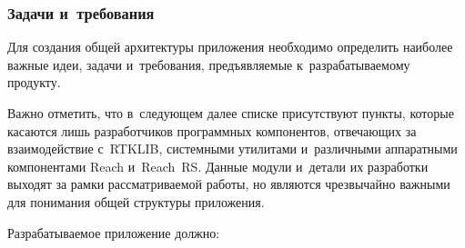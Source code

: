 \subsubsection{Задачи и~требования}
\label{subsec:app-requirements}

Для создания общей архитектуры приложения необходимо определить наиболее важные идеи, задачи и~требования, предъявляемые к~разрабатываемому продукту. \par

Важно отметить, что в~следующем далее списке присутствуют пункты, которые касаются лишь разработчиков программных компонентов, отвечающих за взаимодействие с~RTKLIB, системными утилитами и~различными аппаратными компонентами Reach и~Reach~RS. Данные модули и~детали их разработки выходят за рамки рассматриваемой работы, но являются чрезвычайно важными для понимания общей структуры приложения. \par

Разрабатываемое приложение должно:

